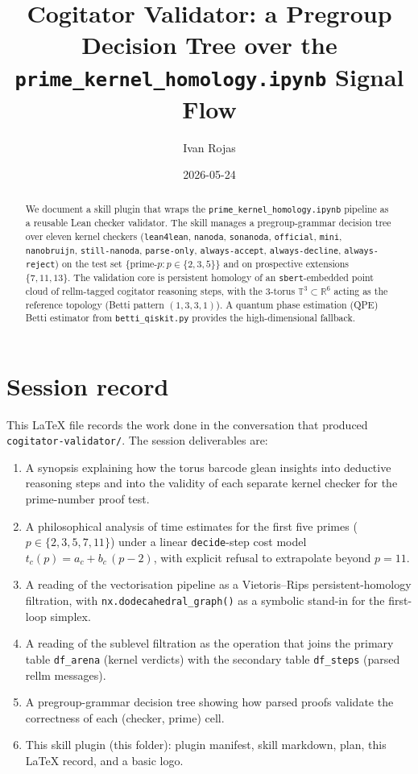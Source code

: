 \documentclass[11pt,a4paper]{article}
\title{Cogitator Validator: a Pregroup Decision Tree over the \\
       \texttt{prime\_kernel\_homology.ipynb} Signal Flow}
\author{Ivan Rojas}
\date{2026-05-24}
\begin{document}
\maketitle

\begin{abstract}
We document a skill plugin that wraps the
\texttt{prime\_kernel\_homology.ipynb} pipeline as a reusable Lean
checker validator. The skill manages a pregroup-grammar decision
tree over eleven kernel checkers (\texttt{lean4lean}, \texttt{nanoda},
\texttt{sonanoda}, \texttt{official}, \texttt{mini},
\texttt{nanobruijn}, \texttt{still-nanoda}, \texttt{parse-only},
\texttt{always-accept}, \texttt{always-decline}, \texttt{always-reject})
on the test set $\{\textrm{prime-}p : p \in \{2, 3, 5\}\}$ and on
prospective extensions $\{7, 11, 13\}$.
The validation core is persistent homology of an
\texttt{sbert}-embedded point cloud of rellm-tagged cogitator
reasoning steps, with the 3-torus $\mathbb{T}^3 \subset \mathbb{R}^6$
acting as the reference topology (Betti pattern $(1, 3, 3, 1)$). A
quantum phase estimation (QPE) Betti estimator from
\texttt{betti\_qiskit.py} provides the high-dimensional fallback.
\end{abstract}

\section{Session record}

This LaTeX file records the work done in the conversation that
produced \texttt{cogitator-validator/}. The session deliverables are:

\begin{enumerate}
  \item A synopsis explaining how the torus barcode glean insights
        into deductive reasoning steps and into the validity of each
        separate kernel checker for the prime-number proof test.
  \item A philosophical analysis of time estimates for the first
        five primes ($p \in \{2,3,5,7,11\}$) under a linear
        \texttt{decide}-step cost model
        $t_c(p) = a_c + b_c \, (p - 2)$, with explicit refusal to
        extrapolate beyond $p = 11$.
  \item A reading of the vectorisation pipeline as a Vietoris--Rips
        persistent-homology filtration, with
        \texttt{nx.dodecahedral\_graph()} as a symbolic stand-in for
        the first-loop simplex.
  \item A reading of the sublevel filtration as the operation that
        joins the primary table \texttt{df\_arena} (kernel verdicts)
        with the secondary table \texttt{df\_steps} (parsed rellm
        messages).
  \item A pregroup-grammar decision tree showing how parsed proofs
        validate the correctness of each (checker, prime) cell.
  \item This skill plugin (this folder): plugin manifest, skill
        markdown, plan, this LaTeX record, and a basic logo.
\end{enumerate}
\end{document}
